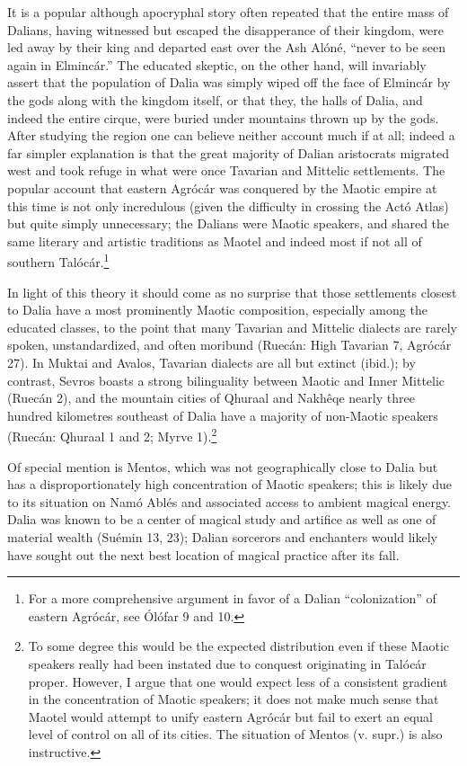 \documentclass{article}
\begin{document}
{It is a popular although apocryphal story often repeated that the entire mass of Dalians, having witnessed but escaped the disapperance of their kingdom, were led away by their king and departed east over the Ash Alóné, ``never to be seen again in Elmincár.'' The educated skeptic, on the other hand, will invariably assert that the population of Dalia was simply wiped off the face of Elmincár by the gods along with the kingdom itself, or that they, the halls of Dalia, and indeed the entire cirque, were buried under mountains thrown up by the gods. After studying the region one can believe neither account much if at all; indeed a far simpler explanation is that the great majority of Dalian aristocrats migrated west and took refuge in what were once Tavarian and Mittelic settlements. The popular account that eastern Agrócár was conquered by the Maotic empire at this time is not only incredulous (given the difficulty in crossing the Actó Atlas) but quite simply unnecessary; the Dalians were Maotic speakers, and shared the same literary and artistic traditions as Maotel and indeed most if not all of southern Talócár.\footnote{For a more comprehensive argument in favor of a Dalian ``colonization'' of eastern Agrócár, see Ólófar 9 and 10.}

In light of this theory it should come as no surprise that those settlements closest to Dalia have a most prominently Maotic composition, especially among the educated classes, to the point that many Tavarian and Mittelic dialects are rarely spoken, unstandardized, and often moribund (Ruecán: High Tavarian 7, Agrócár 27). In Muktai and Avalos, Tavarian dialects are all but extinct (ibid.); by contrast, Sevros boasts a strong bilinguality between Maotic and Inner Mittelic (Ruecán 2), and the mountain cities of Qhuraal and Nakhêqe nearly three hundred kilometres southeast of Dalia have a majority of non-Maotic speakers (Ruecán: Qhuraal 1 and 2; Myrve 1).\footnote{To some degree this would be the expected distribution even if these Maotic speakers really had been instated due to conquest originating in Talócár proper. However, I argue that one would expect less of a consistent gradient in the concentration of Maotic speakers; it does not make much sense that Maotel would attempt to unify eastern Agrócár but fail to exert an equal level of control on all of its cities. The situation of Mentos (v. supr.) is also instructive.}

Of special mention is Mentos, which was not geographically close to Dalia but has a disproportionately high concentration of Maotic speakers; this is likely due to its situation on Namó Ablés and associated access to ambient magical energy. Dalia was known to be a center of magical study and artifice as well as one of material wealth (Suémin 13, 23); Dalian sorcerors and enchanters would likely have sought out the next best location of magical practice after its fall.


}
\end{document}
